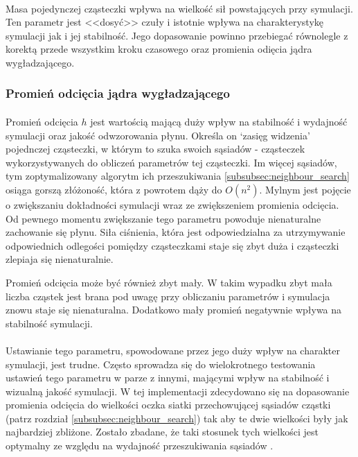 \paragraph{}
Masa pojedynczej cząsteczki wpływa na wielkość sił powstających przy symulacji. Ten parametr jest <<dosyć>> czuły i istotnie wpływa na charakterystykę symulacji jak i jej stabilność. Jego dopasowanie powinno przebiegać równolegle z korektą przede wszystkim kroku czasowego oraz promienia odięcia jądra wygładzającego.
\par

\subsubsection{Promień odcięcia jądra wygładzającego}

\paragraph{}
Promień odcięcia $h$ jest wartością mającą duży wpływ na stabilność i wydajność symulacji oraz jakość odwzorowania płynu. Określa on `zasięg widzenia' pojednczej cząsteczki, w którym to szuka swoich sąsiadów - cząsteczek wykorzystywanych do obliczeń parametrów tej cząsteczki. Im więcej sąsiadów, tym zoptymalizowany algorytm ich przeszukiwania \eqref{subsubsec:neighbour_search} osiąga gorszą złóżoność, która z powrotem dąży do $O(n^2)$. Mylnym jest pojęcie o zwiększaniu dokładności symulacji wraz ze zwiększeniem promienia odcięcia. Od pewnego momentu zwiększanie tego parametru powoduje nienaturalne zachowanie się płynu. Siła ciśnienia, która jest odpowiedzialna za utrzymywanie odpowiednich odlegości pomiędzy cząsteczkami staje się zbyt duża i cząsteczki zlepiaja się nienaturalnie.
\par
Promień odcięcia może być również zbyt mały. W takim wypadku zbyt mała liczba cząstek jest brana pod uwagę przy obliczaniu parametrów i symulacja znowu staje się nienaturalna. Dodatkowo mały promień negatywnie wpływa na stabilność symulacji.
\par
\paragraph{}
Ustawianie tego parametru, spowodowane przez jego duży wpływ na charakter symulacji, jest trudne. Często sprowadza się do wielokrotnego testowania ustawień tego parametru w parze z innymi, mającymi wpływ na stabilność i wizualną jakość symulacji. W tej implementacji zdecydowano się na dopasowanie promienia odcięcia do wielkości oczka siatki przechowującej sąsiadów cząstki (patrz rozdział \eqref{subsubsec:neighbour_search}) tak aby te dwie wielkości były jak najbardziej zbliżone. Zostało zbadane, że taki stosunek tych wielkości jest optymalny ze względu na wydajność przeszukiwania sąsiadów \cite{teschner14}.
\par

